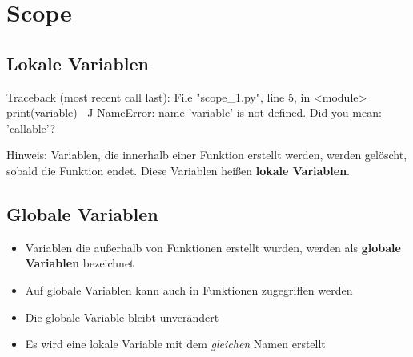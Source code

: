 \livecoding

\subtitle{Kapitel 6: wie Funktionen funktionieren}

\section{Scope}
\subsection{Lokale Variablen}
\begin{frame}[fragile]
    \slidehead
    \vspace{-1em}
    \pause
    \vspace{-1em}
    \begin{commandshell}[fontsize=\footnotesize][minted language=text,top=0cm,bottom=0cm]
        Traceback (most recent call last):
        File "scope_1.py", line 5, in <module>
            print(variable)
                ^^^^^^^^
        NameError: name 'variable' is not defined. Did you mean: 'callable'?
    \end{commandshell}
    \vspace{-1em}
    \begin{block}{Hinweis:}
        Variablen, die innerhalb einer Funktion erstellt werden, werden gelöscht, sobald die Funktion endet.
        Diese Variablen heißen \textbf{lokale Variablen}.
    \end{block}
\end{frame}

\subsection{Globale Variablen}
\begin{frame}
    \slidehead
    \begin{itemize}
        \item Variablen die außerhalb von Funktionen erstellt wurden, werden als \textbf{globale Variablen} bezeichnet
        \item Auf globale Variablen kann auch in Funktionen zugegriffen werden
    \end{itemize}
\end{frame}

\begin{frame}
    \slidehead
    \begin{itemize}
        \item Die globale Variable  bleibt unverändert
        \item Es wird eine lokale Variable mit dem \textit{gleichen} Namen erstellt
    \end{itemize}
\end{frame}

